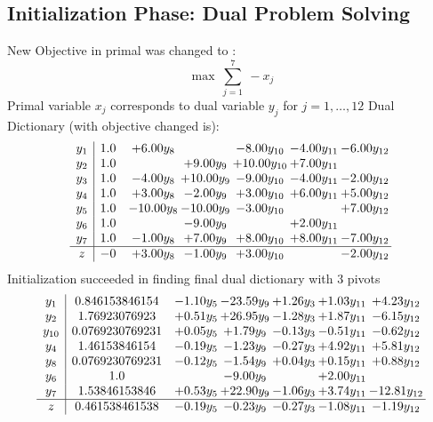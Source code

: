 \documentclass[9pt]{article}
\begin{document}
\subsection{Initialization Phase: Dual Problem Solving}
New Objective in primal was changed to : \[ \max\ \sum_{j=1}^{7}\ - x_j \] 
Primal variable $x_j$ corresponds to dual variable $y_j$ for $j = 1,\ldots,12$
Dual Dictionary (with objective changed is): 
\[\begin{array}{c| c c@{\hskip 2pt} c@{\hskip 2pt} c@{\hskip 2pt} c@{\hskip 2pt} c@{\hskip 2pt} }
 y_{1}   &  1.0 & +  6.00 y_{8} &   & -8.00 y_{10} & -4.00 y_{11} & -6.00 y_{12}\\
 y_{2}   &  1.0  &   & +  9.00 y_{9} & + 10.00 y_{10} & +  7.00 y_{11} &   \\
 y_{3}   &  1.0 & -4.00 y_{8} & + 10.00 y_{9} & -9.00 y_{10} & -4.00 y_{11} & -2.00 y_{12}\\
 y_{4}   &  1.0 & +  3.00 y_{8} & -2.00 y_{9} & +  3.00 y_{10} & +  6.00 y_{11} & +  5.00 y_{12}\\
 y_{5}   &  1.0 & -10.00 y_{8} & -10.00 y_{9} & -3.00 y_{10} &   & +  7.00 y_{12}\\
 y_{6}   &  1.0  &   & -9.00 y_{9} &   & +  2.00 y_{11} &   \\
 y_{7}   &  1.0 & -1.00 y_{8} & +  7.00 y_{9} & +  8.00 y_{10} & +  8.00 y_{11} & -7.00 y_{12}\\
\hline
z    &  -0 & +  3.00 y_{8} & -1.00 y_{9} & +  3.00 y_{10} &   & -2.00 y_{12}\\
\end{array}\]
Initialization succeeded in finding final dual dictionary with 3 pivots
\[\begin{array}{c| c c@{\hskip 2pt} c@{\hskip 2pt} c@{\hskip 2pt} c@{\hskip 2pt} c@{\hskip 2pt} }
 y_{1}   &  0.846153846154 & -1.10 y_{5} & -23.59 y_{9} & +  1.26 y_{3} & +  1.03 y_{11} & +  4.23 y_{12}\\
 y_{2}   &  1.76923076923 & +  0.51 y_{5} & + 26.95 y_{9} & -1.28 y_{3} & +  1.87 y_{11} & -6.15 y_{12}\\
 y_{10}   &  0.0769230769231 & +  0.05 y_{5} & +  1.79 y_{9} & -0.13 y_{3} & -0.51 y_{11} & -0.62 y_{12}\\
 y_{4}   &  1.46153846154 & -0.19 y_{5} & -1.23 y_{9} & -0.27 y_{3} & +  4.92 y_{11} & +  5.81 y_{12}\\
 y_{8}   &  0.0769230769231 & -0.12 y_{5} & -1.54 y_{9} & +  0.04 y_{3} & +  0.15 y_{11} & +  0.88 y_{12}\\
 y_{6}   &  1.0  &   & -9.00 y_{9} &   & +  2.00 y_{11} &   \\
 y_{7}   &  1.53846153846 & +  0.53 y_{5} & + 22.90 y_{9} & -1.06 y_{3} & +  3.74 y_{11} & -12.81 y_{12}\\
\hline
z    &  0.461538461538 & -0.19 y_{5} & -0.23 y_{9} & -0.27 y_{3} & -1.08 y_{11} & -1.19 y_{12}\\
\end{array}\]
\end{document}
